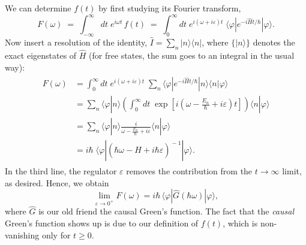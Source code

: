 \documentclass[pra,12pt]{revtex4}
\begin{document}
We can determine $f(t)$ by first studying its Fourier transform,
\begin{equation}
  F(\omega) \;=\; \int_{-\infty}^\infty dt \; e^{i\omega t}\, f(t) \;=\; \int_0^\infty dt \; e^{i(\omega + i\varepsilon) t} \; \langle\varphi|e^{-i\hat{H}t/\hbar}|\varphi\rangle.
\end{equation}
Now insert a resolution of the identity, $\hat{I} = \sum_n
|n\rangle\langle n|$, where $\{|n\rangle\}$ denotes the exact
eigenstates of $\hat{H}$ (for free states, the sum goes to an integral
in the usual way):
\begin{align}
  \begin{aligned}F(\omega) &= \int_0^\infty dt \; e^{i(\omega + i\varepsilon) t} \; \sum_n \langle\varphi|e^{-i\hat{H}t/\hbar}|n\rangle\langle n|\varphi\rangle \\ &= \sum_n \langle\varphi|n\rangle \left( \int_0^\infty dt \; \exp\left[i\left(\omega - \frac{E_n}{\hbar} + i\varepsilon\right) t\right] \right) \langle n|\varphi\rangle \\ &= \sum_n \langle\varphi|n\rangle \frac{i}{\omega - \frac{E_n}{\hbar} + i \varepsilon} \langle n|\varphi\rangle \\ &= i \hbar\; \langle \varphi | \left(\hbar\omega - \hat{H} + i\hbar\varepsilon \right)^{\!-1} | \varphi\rangle. \end{aligned}
\end{align}
In the third line, the regulator $\varepsilon$ removes the
contribution from the $t \rightarrow\infty$ limit, as desired.  Hence,
we obtain
\begin{equation}
  \lim_{\varepsilon \rightarrow 0^+} F(\omega) = i \hbar \, \langle \varphi | \hat{G}(\hbar\omega) | \varphi\rangle,
\end{equation}
where $\hat{G}$ is our old friend the causal Green's function.  The
fact that the \textit{causal} Green's function shows up is due to our
definition of $f(t)$, which is non-vanishing only for $t \ge 0$.
\end{document}

